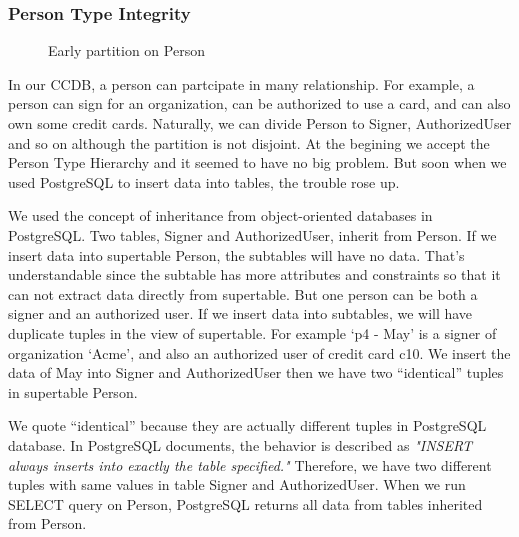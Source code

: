 \documentclass[11pt]{article}
\begin{document}
\subsubsection{Person Type Integrity}

\begin{figure}
\centering
{}
\caption{Early partition on Person}
\end{figure}

\par
In our CCDB, a person can partcipate in many relationship. For example, a person can sign for an organization, can be authorized to use a card, and can also own some credit cards. Naturally, we can divide Person to Signer, AuthorizedUser and so on although the partition is not disjoint. At the begining we accept the Person Type Hierarchy and it seemed to have no big problem. But soon when we used PostgreSQL to insert data into tables, the trouble rose up.

\par
We used the concept of inheritance from object-oriented databases in PostgreSQL. Two tables, Signer and AuthorizedUser, inherit from Person. If we insert data into supertable Person, the subtables will have no data. That's understandable since the subtable has more attributes and constraints so that it can not extract data directly from supertable. But one person can be both a signer and an authorized user. If we insert data into subtables, we will have duplicate tuples in the view of supertable. For example `p4 - May' is a signer of organization `Acme', and also an authorized user of credit card c10. We insert the data of May into Signer and AuthorizedUser then we have two ``identical'' tuples in supertable Person.

\par
We quote ``identical'' because they are actually different tuples in PostgreSQL database. In PostgreSQL documents, the behavior is described as \emph{"INSERT always inserts into exactly the table specified."} Therefore, we have two different tuples with same values in table Signer and AuthorizedUser. When we run SELECT query on Person, PostgreSQL returns all data from tables inherited from Person.
\end{document}
